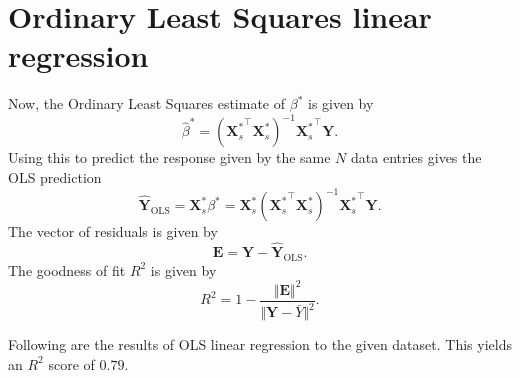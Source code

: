 \documentclass[10pt]{article}
\renewcommand{\vec}{\bm}
\begin{document}
    \section{Ordinary Least Squares linear regression}

    Now, the Ordinary Least Squares estimate of $\beta^*$ is given by \[
        \hat{\beta}^* = ({\vec{X}_s^*}^\top\vec{X}_s^*)^{-1}{\vec{X}_s^*}^\top \vec{Y}.
    \] Using this to predict the response given by the same $N$ data entries gives
    the OLS prediction \[
        \hat{\vec{Y}}_{\text{OLS}} = \vec{X}_s^*\beta^* =
        \vec{X}_s^*({\vec{X}_s^*}^\top\vec{X}_s^*)^{-1}{\vec{X}_s^*}^\top \vec{Y}.
    \] The vector of residuals is given by \[
        \vec{E} = \vec{Y} - \hat{\vec{Y}}_{\text{OLS}}.
    \] The goodness of fit $R^2$ is given by \[
        R^2 = 1 - \frac{\Vert \vec{E}\Vert^2}{\Vert \vec{Y} - \bar{Y}\Vert^2}.
    \]

    Following are the results of OLS linear regression to the given dataset. This
    yields an $R^2$ score of $0.79$.
\end{document}

